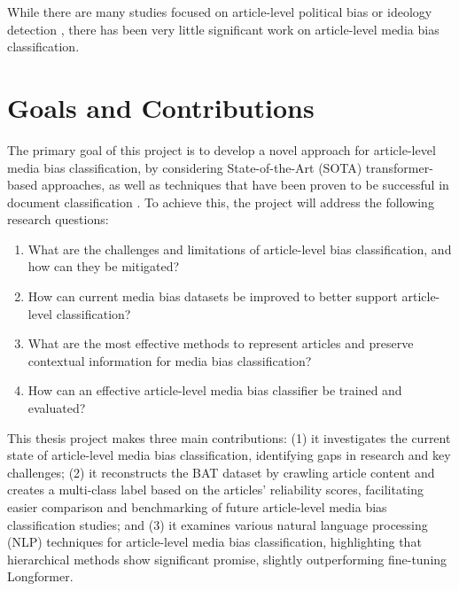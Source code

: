 While there are many studies focused on article-level political bias or ideology detection \cite{kulkarni-2018-multi-view,baly-2020-we-can-detect-your-bias,baly-2019-mt}, there has been very little significant work on article-level media bias classification.

\section{Goals and Contributions}

The primary goal of this project is to develop a novel approach for article-level media bias classification, by considering State-of-the-Art (SOTA) transformer-based approaches, as well as techniques that have been proven to be successful in document classification \cite{su-2021-classifying,wan-2019-long-length,park-2022-efficient,pappagari-2019-hierarchical}. To achieve this, the project will address the following research questions:
\begin{enumerate}
    \item What are the challenges and limitations of article-level bias classification, and how can they be mitigated?
    \item How can current media bias datasets be improved to better support article-level classification?
    \item What are the most effective methods to represent articles and preserve contextual information for media bias classification?
    \item How can an effective article-level media bias classifier be trained and evaluated?
\end{enumerate}

This thesis project makes three main contributions: (1) it investigates the current state of article-level media bias classification, identifying gaps in research and key challenges; (2) it reconstructs the BAT dataset by crawling article content and creates a multi-class label based on the articles' reliability scores, facilitating easier comparison and benchmarking of future article-level media bias classification studies; and (3) it examines various natural language processing (NLP) techniques for article-level media bias classification, highlighting that hierarchical methods show significant promise, slightly outperforming fine-tuning Longformer.


